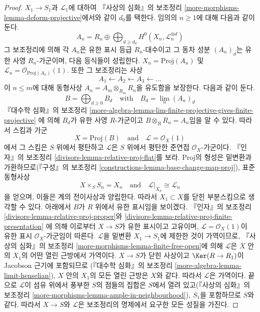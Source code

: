 \begin{proof}
$X_1 \to S_1$과 $\mathcal{L}_1$에 대하여 『사상의 심화』의 보조정리
\ref{more-morphisms-lemma-deform-projective}에서와 같이 $d_0$를 택한다.
임의의 $n \geq 1$에 대해 다음과 같이 둔다.
$$
A_n = R_n \oplus
\bigoplus\nolimits_{d \geq d_0} H^0(X_n, \mathcal{L}_n^{\otimes d})
$$
그 보조정리에 의해 각 $A_n$은 유한 표시 등급 $R_n$-대수이고 그 동차 성분
$(A_n)_d$는 유한 사영 $R_n$-가군이며, 다음 등식들이 성립한다.
$X_n = \text{Proj}(A_n)$ 및
$\mathcal{L}_n = \mathcal{O}_{\text{Proj}(A_n)}(1)$. 또한 그 보조정리는 사상
$$
A_1 \leftarrow A_2 \leftarrow A_3 \leftarrow \ldots
$$
이 $n \leq m$에 대해 동형사상
$A_n = A_m \otimes_{R_m} R_n$을 유도함을 보장한다. 다음과 같이 둔다.
$$
B = \bigoplus\nolimits_{d \geq 0} B_d
\quad\text{with}\quad
B_d = \lim_n (A_n)_d
$$
『대수학 심화』의 보조정리
\ref{more-algebra-lemma-lim-finite-projective-gives-finite-projective}
에 의해 $B_d$가 유한 사영 $R$-가군이고
$B \otimes_R R_n = A_n$임을 알 수 있다. 따라서 스킴과 가군
$$
X = \text{Proj}(B)
\quad\text{and}\quad
\mathcal{L} = \mathcal{O}_X(1)
$$
에서 그 스킴은 $S$ 위에서 평탄하고 $\mathcal{L}$은 $S$ 위에서 평탄한 준연접
$\mathcal{O}_X$-가군이다. 『인자』의 보조정리
\ref{divisors-lemma-relative-proj-flat}를 보라. Proj의 형성은 밑변환과
가환하므로(『구성』의 보조정리
\ref{constructions-lemma-base-change-map-proj}), 표준 동형사상
$$
X \times_S S_n = X_n
\quad\text{and}\quad
\mathcal{L}|_{X_n} \cong \mathcal{L}_n
$$
을 얻으며, 이들은 계의 전이사상과 양립한다. 따라서 $X_1 \subset X$를
닫힌 부분스킴으로 생각할 수 있다. 아래에서 $B$가 $R$ 위에서 유한 표시임을
보이겠다.
『인자』의 보조정리 \ref{divisors-lemma-relative-proj-proper}와
\ref{divisors-lemma-relative-proj-finite-presentation}
에 의해 이로부터 $X \to S$가 유한 표시이고 고유이며,
$\mathcal{L} = \mathcal{O}_X(1)$이 유한 표시 $\mathcal{O}_X$-가군임이 따른다.
$\mathcal{L}$을 밑변환 $X_1 \to S_1$에 제한한 것이 가역이므로,
『사상의 심화』의 보조정리 \ref{more-morphisms-lemma-finite-free-open}에 의해
$\mathcal{L}$은 $X$ 안의 $X_1$의 어떤 열린 근방에서 가역이다.
$X \to S$가 닫힌 사상이고 $\Ker(R \to R_1)$이 Jacobson 근기에 포함되므로
(『대수학 심화』의 보조정리 \ref{more-algebra-lemma-limit-henselian}), $X$ 안의
$X_1$의 모든 열린 근방은 $X$와 같다. 따라서 $\mathcal{L}$은 가역이다.
끝으로 $\mathcal{L}$이 섬유 위에서 풍부한 $S$의 점들의 집합은 $S$에서
열려 있고(『사상의 심화』의 보조정리
\ref{more-morphisms-lemma-ample-in-neighbourhood}), $S_1$을 포함하므로 $S$와
같다. 따라서 $X \to S$와 $\mathcal{L}$은 보조정리의 명제에서 요구한 모든
성질을 가진다.


\end{proof}
